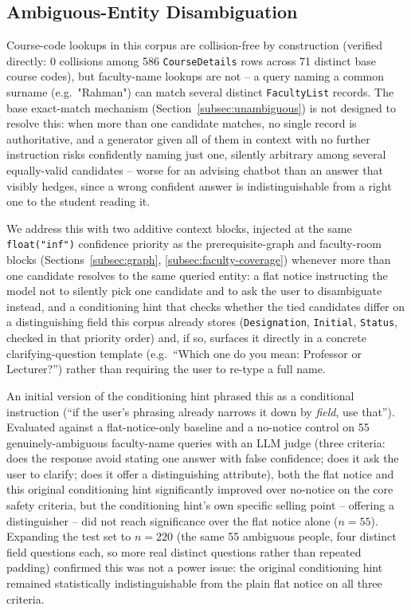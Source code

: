 \documentclass[a4paper,twoside]{article}
\begin{document}
\subsection{Ambiguous-Entity Disambiguation}
\label{subsec:conditioning}

Course-code lookups in this corpus are collision-free by construction (verified directly: 0 collisions among 586 \texttt{CourseDetails} rows across 71 distinct base course codes), but faculty-name lookups are not -- a query naming a common surname (e.g.\ "Rahman") can match several distinct \texttt{FacultyList} records. The base exact-match mechanism (Section~\ref{subsec:unambiguous}) is not designed to resolve this: when more than one candidate matches, no single record is authoritative, and a generator given all of them in context with no further instruction risks confidently naming just one, silently arbitrary among several equally-valid candidates -- worse for an advising chatbot than an answer that visibly hedges, since a wrong confident answer is indistinguishable from a right one to the student reading it.

We address this with two additive context blocks, injected at the same \texttt{float("inf")} confidence priority as the prerequisite-graph and faculty-room blocks (Sections~\ref{subsec:graph}, \ref{subsec:faculty-coverage}) whenever more than one candidate resolves to the same queried entity: a flat notice instructing the model not to silently pick one candidate and to ask the user to disambiguate instead, and a conditioning hint that checks whether the tied candidates differ on a distinguishing field this corpus already stores (\texttt{Designation}, \texttt{Initial}, \texttt{Status}, checked in that priority order) and, if so, surfaces it directly in a concrete clarifying-question template (e.g.\ ``Which one do you mean: Professor or Lecturer?'') rather than requiring the user to re-type a full name.

An initial version of the conditioning hint phrased this as a conditional instruction (``if the user's phrasing already narrows it down by \emph{field}, use that''). Evaluated against a flat-notice-only baseline and a no-notice control on 55 genuinely-ambiguous faculty-name queries with an LLM judge (three criteria: does the response avoid stating one answer with false confidence; does it ask the user to clarify; does it offer a distinguishing attribute), both the flat notice and this original conditioning hint significantly improved over no-notice on the core safety criteria, but the conditioning hint's own specific selling point -- offering a distinguisher -- did not reach significance over the flat notice alone ($n=55$). Expanding the test set to $n=220$ (the same 55 ambiguous people, four distinct field questions each, so more real distinct questions rather than repeated padding) confirmed this was not a power issue: the original conditioning hint remained statistically indistinguishable from the plain flat notice on all three criteria.
\end{document}
